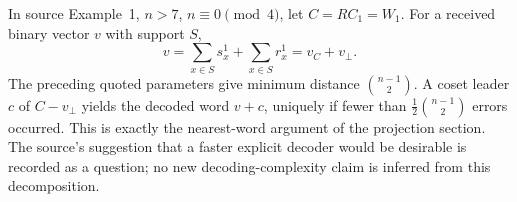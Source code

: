 In source Example~1, $n>7$, $n\equiv0\pmod4$, let
$C=RC_1=W_1$. For a received binary vector $v$ with support $S$,
\[
 v=\sum_{x\in S}s_x^1+\sum_{x\in S}r_x^1=v_C+v_\perp.
\]
The preceding quoted parameters give minimum distance
$\binom{n-1}2$. A coset leader $c$ of $C-v_\perp$ yields the decoded
word $v+c$, uniquely if fewer than $\tfrac12\binom{n-1}2$ errors
occurred. This is exactly the nearest-word argument of the projection
section. The source's suggestion that a faster explicit decoder would
be desirable is recorded as a question; no new decoding-complexity claim
is inferred from this decomposition.
